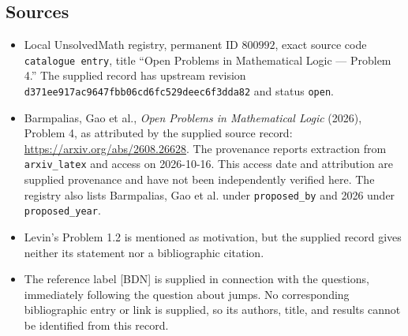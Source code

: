 \documentclass[11pt]{article}
\begin{document}
\subsection{Sources}
\begin{itemize}
\item Local UnsolvedMath registry, permanent ID \(800992\), exact source code \texttt{catalogue entry}, title ``Open Problems in Mathematical Logic --- Problem 4.'' The supplied record has upstream revision \texttt{d371ee917ac9647fbb06cd6fc529deec6f3dda82} and status \texttt{open}.
\item Barmpalias, Gao et al., \emph{Open Problems in Mathematical Logic} (2026), Problem 4, as attributed by the supplied source record: \url{https://arxiv.org/abs/2608.26628}. The provenance reports extraction from \texttt{arxiv\_latex} and access on 2026-10-16. This access date and attribution are supplied provenance and have not been independently verified here. The registry also lists Barmpalias, Gao et al. under \texttt{proposed\_by} and 2026 under \texttt{proposed\_year}.
\item Levin's Problem 1.2 is mentioned as motivation, but the supplied record gives neither its statement nor a bibliographic citation.
\item The reference label [BDN] is supplied in connection with the questions, immediately following the question about jumps. No corresponding bibliographic entry or link is supplied, so its authors, title, and results cannot be identified from this record.
\end{itemize}
\end{document}
